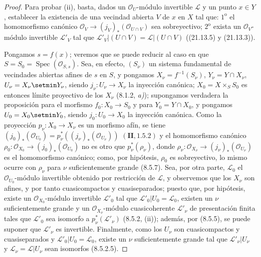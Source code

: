 \begin{proof}
Para probar (ii), basta, dados un $\mathcal O_U$-módulo invertible $\mathscr L$
y un punto $x\in Y$, establecer la existencia de una vecindad abierta $V$ de $x$
en $X$ tal que: $1^{\mathrm o}$ el homomorfismo canónico
$\mathcal O_V\to(j_V)_*(\mathcal O_{U\cap V})$ sea sobreyectivo;
$2^{\mathrm o}$ exista un $\mathcal O_V$-módulo invertible $\mathscr L'_V$ tal que
$\mathscr L'_V|(U\cap V)=\mathscr L|(U\cap V)$ ((21.13.5) y (21.13.3)).

Pongamos $s=f(x)$; veremos que se puede reducir al caso en que
$S=S_0=\operatorname{Spec}(\mathcal O_{S,s})$. Sea, en efecto, $(S_\nu)$ un sistema
fundamental de vecindades abiertas afines de $s$ en $S$, y pongamos
$X_\nu=f^{-1}(S_\nu)$, $Y_\nu=Y\cap X_\nu$, $U_\nu=X_\nu\setmin Y_\nu$,
siendo $j_\nu:U_\nu\to X_\nu$ la inyección canónica; $X_0=X\times_S S_0$ es entonces
límite proyectivo de los $X_\nu$ (8.1.2, \emph{a)}); supongamos verdadera la proposición para el
morfismo $f_0:X_0\to S_0$ y para $Y_0=Y\cap X_0$, y pongamos $U_0=X_0\setmin Y_0$,
siendo $j_0:U_0\to X_0$ la inyección canónica. Como la proyección
$p_\nu:X_0\to X_\nu$ es un morfismo afín, se tiene
$(j_0)_*(\mathcal O_{U_0})=p_\nu^*((j_\nu)_*(\mathcal O_{U_\nu}))$
$(\mathbf{II}, 1.5.2)$
y el homomorfismo canónico
$\rho_0:\mathcal O_{X_0}\to(j_0)_*(\mathcal O_{U_0})$ no es otro que
$p_\nu^*(\rho_\nu)$, donde
$\rho_\nu:\mathcal O_{X_\nu}\to(j_\nu)_*(\mathcal O_{U_\nu})$ es el homomorfismo
canónico; como, por hipótesis, $\rho_0$ es sobreyectivo, lo mismo ocurre con $\rho_\nu$
para $\nu$ suficientemente 
grande (8.5.7). Sea, por otra parte, $\mathscr L_0$ el
$\mathcal O_{U_0}$-módulo invertible obtenido por restricción de $\mathscr L$, y observemos que los
$X_\nu$ son afines, y por tanto cuasicompactos y cuasiseparados; puesto que, por hipótesis,
existe un $\mathcal O_{X_0}$-módulo invertible $\mathscr L'_0$ tal que
$\mathscr L'_0|U_0=\mathscr L_0$, existen un $\nu$ suficientemente grande y un
$\mathcal O_{X_\nu}$-módulo cuasicoherente $\mathscr L'_\nu$ de presentación finita
tales que $\mathscr L'_0$ sea isomorfo a $p_\nu^*(\mathscr L'_\nu)$ (8.5.2, (ii));
además, por (8.5.5), se puede suponer que $\mathscr L'_\nu$ es invertible. Finalmente, como
los $U_\nu$ son cuasicompactos y cuasiseparados y
$\mathscr L'_0|U_0=\mathscr L_0$, existe un $\nu$ suficientemente grande tal que
$\mathscr L'_\nu|U_\nu$ y $\mathscr L_\nu=\mathscr L|U_\nu$ sean isomorfos (8.5.2.5).



\end{proof}
